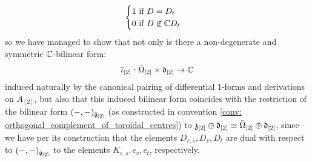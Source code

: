 \begin{remark}
$$\begin{cases}
                        \text{$1$ if $D = D_t$}
                        \\
                        \text{$0$ if $D \not \in \mathbb{C} D_t$}
                    \end{cases}
                $$
            so we have managed to show that not only is there a non-degenerate and symmetric $\mathbb{C}$-bilinear form:
                $$\bar{\iota}_{[2]}: \bar{\Omega}_{[2]} \x \d_{[2]} \to \bbC$$
            induced naturally by the canonical pairing of differential $1$-forms and derivations on $A_{[2]}$, but also that this induced bilinear form coincides with the restriction of the bilinear form $(-, -)_{\hat{\mathfrak{g}}_{[2]}}$ (as constructed in convention \ref{conv: orthogonal_complement_of_toroidal_centres}) to $\mathfrak{z}_{[2]} \oplus \mathfrak{d}_{[2]} \simeq \bar{\Omega}_{[2]} \oplus \mathfrak{d}_{[2]}$, since we have per its construction that the elements $D_{r, s}, D_v, D_t$ are dual with respect to $(-, -)_{\hat{\mathfrak{g}}_{[2]}}$ to the elements $K_{r, s}, c_v, c_t$, respectively. 
        \end{remark}

